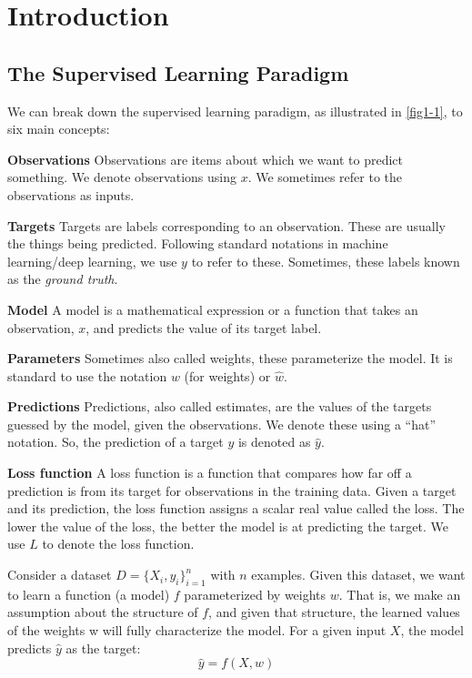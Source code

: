 \chapter{Introduction\label{Ch01}}
\section{The Supervised Learning Paradigm}


We can break down the supervised learning paradigm, as illustrated in \autoref{fig1-1}, to six main concepts:

\textbf{Observations} Observations are items about which we want to predict something. We denote
observations using $x$. We sometimes refer to the observations as inputs.

\textbf{Targets} Targets are labels corresponding to an observation. These are usually the things being predicted. Following standard notations in machine learning/deep learning, we use $y$ to refer to these. Sometimes, these labels known as the \textit{ground truth}.

\textbf{Model} A model is a mathematical expression or a function that takes an observation, $x$, and predicts the value of its target label.

\textbf{Parameters} Sometimes also called weights, these parameterize the model. It is standard to use the notation $w$ (for weights) or $\hat{w}$.

\textbf{Predictions} Predictions, also called estimates, are the values of the targets guessed by the model, given the observations. We denote these using a “hat” notation. So, the prediction of a target $y$ is denoted as $\hat{y}$.

\textbf{Loss function} A loss function is a function that compares how far off a prediction is from its target for observations in the training data. Given a target and its prediction, the loss function assigns a scalar real value called the loss. The lower the value of the loss, the better the model is at predicting the target. We use $L$ to denote the loss function.

Consider a dataset $D = \{X_i, y_i\}_{i=1}^n$ with $n$ examples. Given this dataset, we want to learn a function (a model) $f$ parameterized by weights $w$. That is, we make an assumption about the structure of $f$, and given that structure, the learned values of the weights w will fully characterize the model. For a given input $X$, the model predicts $\hat{y}$ as the target:
$$\hat{y} = f (X,w)$$

